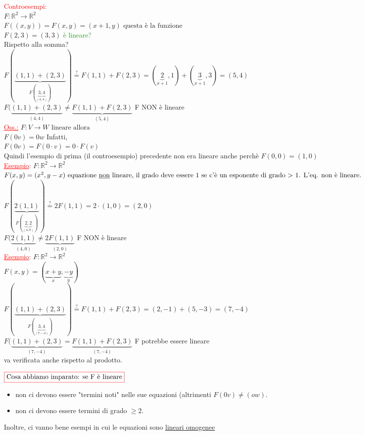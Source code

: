 \textcolor{red}{Controesempi:}\\
$F : \mathbb{R}^2 \longrightarrow \mathbb{R}^2$\\
$F((x,y)) = F(x,y) = (x + 1, y) \text{ questa è la funzione}$\\
$F(2,3) = (3,3)$ \textcolor{ForestGreen}{è lineare?} \\
\textsf{\small Rispetto alla somma?}\\
$F(\underbrace{(1,1) + (2,3)} _{F(\underbrace{3,4} _{(4,4)})}) \overset{?}{=} F(1,1) + F(2,3) = (\underbrace{2} _{x + 1},1) + (\underbrace{3} _{x + 1},3) = (5,4)$ \\
$F(\underbrace{(1,1) + (2,3)} _{(4,4)} \neq \underbrace{F(1,1) + F(2,3)} _{(5,4)}$ \textsf{ F NON è lineare}\\
\textcolor{red}{\underline{Oss.:}} $F : V \longrightarrow W \text{ lineare allora}$\\
$F(0v) = 0w$ \textsf{ Infatti, }\\
$F(0v) = F(0 \cdot v) = 0 \cdot F(v)$\\
\textsf{\small Quindi l'esempio di prima (il controesempio) precedente non era lineare anche perchè $F(0,0) = (1,0)$}\\
\textcolor{red}{\underline{Esempio}:} $F : \mathbb{R}^2 \longrightarrow \mathbb{R}^2$\\
$F(x,y) = (x^2, y - x) \text{ equazione \underline{non} lineare, il grado deve essere 1 se c'è un esponente di grado > 1. L'eq. non è lineare.}$\\
$F(\underbrace{2(1,1)} _{F(\underbrace{2,2} _{(4,0)})}) \overset{?}{=} 2F(1,1) = 2\cdot(1,0) = (2,0)$ \\
$F(\underbrace{2(1,1)} _{(4,0)} \neq \underbrace{2F(1,1)} _{(2,0)}$ \textsf{ F NON è lineare}\\
\textcolor{red}{\underline{Esempio}:} $F : \mathbb{R}^2 \longrightarrow \mathbb{R}^2$\\
$F(x,y) = (\underbrace{x + y} _{x}, \underbrace{-y} _{y})$ \\
\enlargethispage{1\linewidth}
$F(\underbrace{(1,1) + (2,3)} _{F(\underbrace{3,4} _{(7,-4)})}) \overset{?}{=} F(1,1) + F(2,3) = (2,-1) + (5,-3) = (7,-4)$ \\
$F(\underbrace{(1,1) + (2,3)} _{(7,-4)} = \underbrace{F(1,1) + F(2,3)} _{(7,-4)}$ \textsf{ F potrebbe essere lineare}\\

\textsf{va verificata anche rispetto al prodotto.}\\

\newpage

$\color{red}\boxed{\text{\normalcolor Cosa abbiamo imparato: se F è lineare}} \normalcolor$\\
\begin{itemize}
	\item \textsf{\small non ci devono essere "termini noti" nelle sue equazioni (altrimenti $F(0v) \neq (ow)$.}
	\item \textsf{\small non ci devono essere termini di grado $\geq 2$.}
\end{itemize}
\textsf{\small Inoltre, ci vanno bene esempi in cui le equazioni sono \underline{lineari omogenee}}\\

